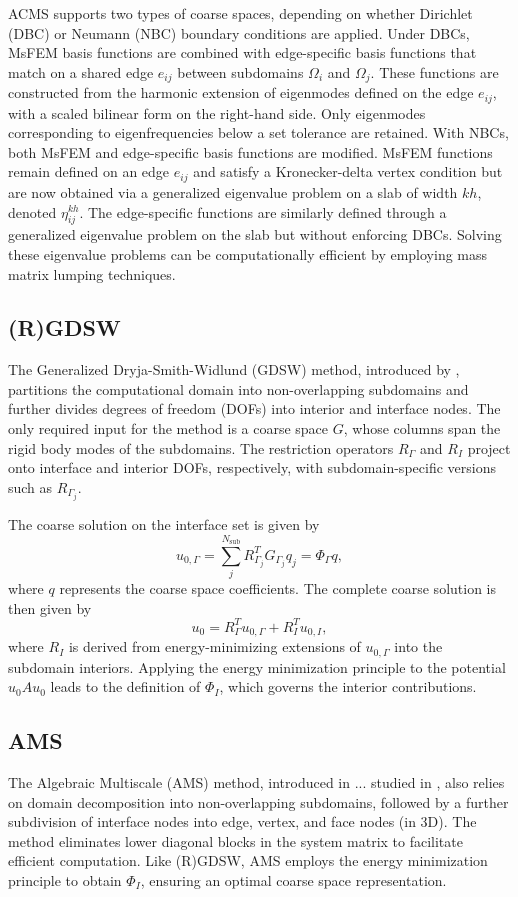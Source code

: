 ACMS supports two types of coarse spaces, depending on whether Dirichlet (DBC) or Neumann (NBC) boundary conditions are applied. Under DBCs, MsFEM basis functions are combined with edge-specific basis functions that match on a shared edge $e_{ij}$ between subdomains $\Omega_i$ and $\Omega_j$. These functions are constructed from the harmonic extension of eigenmodes defined on the edge $e_{ij}$, with a scaled bilinear form on the right-hand side. Only eigenmodes corresponding to eigenfrequencies below a set tolerance are retained. With NBCs, both MsFEM and edge-specific basis functions are modified. MsFEM functions remain defined on an edge $e_{ij}$ and satisfy a Kronecker-delta vertex condition but are now obtained via a generalized eigenvalue problem on a slab of width $kh$, denoted $\eta^{kh}_{ij}$. The edge-specific functions are similarly defined through a generalized eigenvalue problem on the slab but without enforcing DBCs. Solving these eigenvalue problems can be computationally efficient by employing mass matrix lumping techniques.
 
\subsection{(R)GDSW}
The Generalized Dryja-Smith-Widlund (GDSW) method, introduced by \cite{gdsw_coarse_space_Dohrmann2008}, partitions the computational domain into non-overlapping subdomains and further divides degrees of freedom (DOFs) into interior and interface nodes. The only required input for the method is a coarse space $G$, whose columns span the rigid body modes of the subdomains. The restriction operators $R_{\Gamma}$ and $R_I$ project onto interface and interior DOFs, respectively, with subdomain-specific versions such as $R_{\Gamma_j}$.

The coarse solution on the interface set is given by 
\[
    u_{0,\Gamma} = \sum_{j}^{N_{\text{sub}}} R^T_{\Gamma_j} G_{\Gamma_j} q_j = \Phi_{\Gamma} q,
\]
where $q$ represents the coarse space coefficients. The complete coarse solution is then given by 
\[
    u_0 = R^T_{\Gamma} u_{0,\Gamma} + R^T_{I} u_{0,I},
\]
where $R_I$ is derived from energy-minimizing extensions of $u_{0,\Gamma}$ into the subdomain interiors. Applying the energy minimization principle to the potential $u_0 A u_0$ leads to the definition of $\Phi_I$, which governs the interior contributions.
\subsection{AMS}
The Algebraic Multiscale (AMS) method, introduced in ... studied in \cite{ams_coarse_space_comp_study_Alves2024}, also relies on domain decomposition into non-overlapping subdomains, followed by a further subdivision of interface nodes into edge, vertex, and face nodes (in 3D). The method eliminates lower diagonal blocks in the system matrix to facilitate efficient computation. Like (R)GDSW, AMS employs the energy minimization principle to obtain $\Phi_I$, ensuring an optimal coarse space representation.

